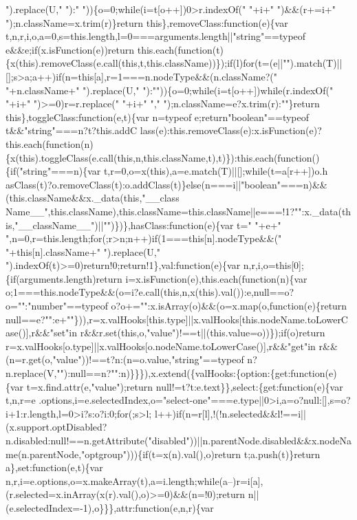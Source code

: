 \begin{DoxyCode}
{       ").replace(U," "):" "))\{o=0;while(i=t[o++])0>r.indexOf(" "+i+" ")&&(r+=i+" ");n.className=x.trim(r)\}return
       this\},removeClass:function(e)\{var t,n,r,i,o,a=0,s=this.length,l=0===arguments.length||"string"==typeof
       e&&e;if(x.isFunction(e))return
       this.each(function(t)\{x(this).removeClass(e.call(this,t,this.className))\});if(l)for(t=(e||"").match(T)||[];s>a;a++)if(n=this[a],r=1===n.nodeType&&(n.className?(" "+n.className+" ").replace(U,"
       "):""))\{o=0;while(i=t[o++])while(r.indexOf(" "+i+" ")>=0)r=r.replace(" "+i+" ","
       ");n.className=e?x.trim(r):""\}return this\},toggleClass:function(e,t)\{var n=typeof e;return"boolean"==typeof
       t&&"string"===n?t?this.addC
      lass(e):this.removeClass(e):x.isFunction(e)?this.each(function(n)\{x(this).toggleClass(e.call(this,n,this.className,t),t)\}):this.each(function()\{if("string"===n)\{var
       t,r=0,o=x(this),a=e.match(T)||[];while(t=a[r++])o.h
      asClass(t)?o.removeClass(t):o.addClass(t)\}else(n===i||"boolean"===n)&&(this.className&&x.\_data(this,"\_\_class
      Name\_\_",this.className),this.className=this.className||e===!1?"":x.\_data(this,"\_\_className\_\_")||"")\})\},hasClass:function(e)\{var t=" "+e+" ",n=0,r=this.length;for(;r>n;n++)if(1===this[n].nodeType&&("
       "+this[n].className+" ").replace(U," ").indexOf(t)>=0)return!0;return!1\},val:function(e)\{var
       n,r,i,o=this[0];\{if(arguments.length)return i=x.isFunction(e),this.each(function(n)\{var
       o;1===this.nodeType&&(o=i?e.call(this,n,x(this).val()):e,null==o?o="":"number"==typeof o?o+="":x.isArray(o)&&(o=x.map(o,function(e)\{return
       null==e?"":e+""\})),r=x.valHooks[this.type]||x.valHooks[this.nodeName.toLowerCase()],r&&"set"in
       r&&r.set(this,o,"value")!==t||(this.value=o))\});if(o)return r=x.valHooks[o.type]||x.valHooks[o.nodeName.toLowerCase()],r&&"get"in
       r&&(n=r.get(o,"value"))!==t?n:(n=o.value,"string"==typeof
       n?n.replace(V,""):null==n?"":n)\}\}\}),x.extend(\{valHooks:\{option:\{get:function(e)\{var t=x.find.attr(e,"value");return null!=t?t:e.text\}\},select:\{get:function(e)\{var
       t,n,r=e
      .options,i=e.selectedIndex,o="select-one"===e.type||0>i,a=o?null:[],s=o?i+1:r.length,l=0>i?s:o?i:0;for(;s>l;
      l++)if(n=r[l],!(!n.selected&&l!==i||(x.support.optDisabled?n.disabled:null!==n.getAttribute("disabled"))||n.parentNode.disabled&&x.nodeName(n.parentNode,"optgroup")))\{if(t=x(n).val(),o)return t;a.push(t)\}return
       a\},set:function(e,t)\{var
       n,r,i=e.options,o=x.makeArray(t),a=i.length;while(a--)r=i[a],(r.selected=x.inArray(x(r).val(),o)>=0)&&(n=!0);return n||(e.selectedIndex=-1),o\}\}\},attr:function(e,n,r)\{var
}
\end{DoxyCode}
